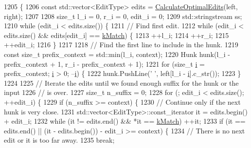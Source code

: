 \begin{DoxyCode}
1205                                               \{
1206   \textcolor{keyword}{const} std::vector<EditType> edits = \hyperlink{namespacetesting_1_1internal_1_1edit__distance_a26323b4c2a29ea8e187aafbd4d2275db}{CalculateOptimalEdits}(left, right);
1207 
1208   \textcolor{keywordtype}{size\_t} l\_i = 0, r\_i = 0, edit\_i = 0;
1209   std::stringstream ss;
1210   \textcolor{keywordflow}{while} (edit\_i < edits.size()) \{
1211     \textcolor{comment}{// Find first edit.}
1212     \textcolor{keywordflow}{while} (edit\_i < edits.size() && edits[edit\_i] == \hyperlink{namespacetesting_1_1internal_1_1edit__distance_ad46aa6da12aec1a3f166310478b53a08a7bdb9c74613a94f21b7489e0b5640a63}{kMatch}) \{
1213       ++l\_i;
1214       ++r\_i;
1215       ++edit\_i;
1216     \}
1217 
1218     \textcolor{comment}{// Find the first line to include in the hunk.}
1219     \textcolor{keyword}{const} \textcolor{keywordtype}{size\_t} prefix\_context = std::min(l\_i, context);
1220     Hunk hunk(l\_i - prefix\_context + 1, r\_i - prefix\_context + 1);
1221     \textcolor{keywordflow}{for} (\textcolor{keywordtype}{size\_t} \hyperlink{gtest__output__test__golden__lin_8txt_a7e98b8a17c0aad30ba64d47b74e2a6c1}{i} = prefix\_context; \hyperlink{gtest__output__test__golden__lin_8txt_a7e98b8a17c0aad30ba64d47b74e2a6c1}{i} > 0; --\hyperlink{gtest__output__test__golden__lin_8txt_a7e98b8a17c0aad30ba64d47b74e2a6c1}{i}) \{
1222       hunk.PushLine(\textcolor{charliteral}{' '}, left[l\_i - \hyperlink{gtest__output__test__golden__lin_8txt_a7e98b8a17c0aad30ba64d47b74e2a6c1}{i}].c\_str());
1223     \}
1224 
1225     \textcolor{comment}{// Iterate the edits until we found enough suffix for the hunk or the input}
1226     \textcolor{comment}{// is over.}
1227     \textcolor{keywordtype}{size\_t} n\_suffix = 0;
1228     \textcolor{keywordflow}{for} (; edit\_i < edits.size(); ++edit\_i) \{
1229       \textcolor{keywordflow}{if} (n\_suffix >= context) \{
1230         \textcolor{comment}{// Continue only if the next hunk is very close.}
1231         std::vector<EditType>::const\_iterator it = edits.begin() + edit\_i;
1232         \textcolor{keywordflow}{while} (it != edits.end() && *it == \hyperlink{namespacetesting_1_1internal_1_1edit__distance_ad46aa6da12aec1a3f166310478b53a08a7bdb9c74613a94f21b7489e0b5640a63}{kMatch}) ++it;
1233         \textcolor{keywordflow}{if} (it == edits.end() || (it - edits.begin()) - edit\_i >= context) \{
1234           \textcolor{comment}{// There is no next edit or it is too far away.}
1235           \textcolor{keywordflow}{break};

\end{DoxyCode}
